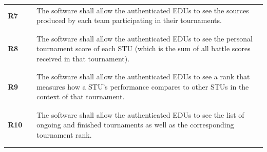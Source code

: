 \begin{longtable}[H]{l l p{12cm}}
    \textbf{R7}  & \vline & The software shall allow the authenticated EDUs to see the sources produced by each team participating in their tournaments.                                                                                                                                             \\
                 &        &                                                                                                                                                                                                                                                                          \\\hline & & \\
    \textbf{R8}  & \vline & The software shall allow the authenticated EDUs to see the personal tournament score of each STU (which is the sum of all battle scores received in that tournament).                                                                                                    \\
                 &        &                                                                                                                                                                                                                                                                          \\\hline & & \\
    \textbf{R9}  & \vline & The software shall allow the authenticated EDUs to see a rank that measures how a STU's performance compares to other STUs in the context of that tournament.                                                                                                            \\
                 &        &                                                                                                                                                                                                                                                                          \\\hline & & \\
    \textbf{R10} & \vline & The software shall allow the authenticated EDUs to see the list of ongoing and finished tournaments as well as the corresponding tournament rank.                                                                                                                        \\
                 &        &                                                                                                                                                                                                                                                                          \\\hline & & \\

\end{longtable}
